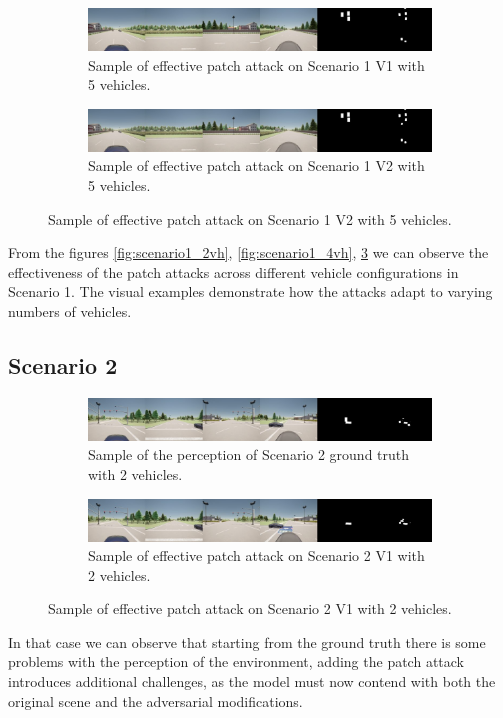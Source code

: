 \begin{figure}[H]
    \centering
    \begin{subfigure}[b]{1\textwidth}
        \centering
        \includegraphics[width=\textwidth]{figures/results/scenario1v15vh.jpg}
        \caption{Sample of effective patch attack on Scenario 1 V1 with 5 vehicles.}
        \label{fig:scenario1_5vh}
    \end{subfigure}
    \vspace{0.5cm}
    \begin{subfigure}[b]{1\textwidth}
        \centering
        \includegraphics[width=\textwidth]{figures/results/scenario1v25vh.jpg}
        \caption{Sample of effective patch attack on Scenario 1 V2 with 5 vehicles.}
        \label{fig:scenario1_5vh}
    \end{subfigure}
\end{figure}

From the figures \ref{fig:scenario1_2vh}, \ref{fig:scenario1_4vh}, \ref{fig:scenario1_5vh} we can observe the effectiveness of the patch attacks across different vehicle configurations in Scenario 1. 
The visual examples demonstrate how the attacks adapt to varying numbers of vehicles.

\subsection{Scenario 2}

\begin{figure}[H]
    \centering
    \begin{subfigure}[b]{1\textwidth}
        \centering
        \includegraphics[width=\textwidth]{figures/results/scenario2gt2vh.jpg}
        \caption{Sample of the perception of Scenario 2 ground truth with 2 vehicles.}
        \label{fig:scenario2_gt2vh}
    \end{subfigure}
    \vspace{0.5cm}
    \begin{subfigure}[b]{1\textwidth}
        \centering
        \includegraphics[width=\textwidth]{figures/results/scenario2v12vh.jpg}
        \caption{Sample of effective patch attack on Scenario 2 V1 with 2 vehicles.}
        \label{fig:scenario2_2vh}
    \end{subfigure}
\end{figure}

In that case we can observe that starting from the ground truth there is some problems with the perception of the environment,
adding the patch attack introduces additional challenges, as the model must now contend with both the original scene and the adversarial modifications.



